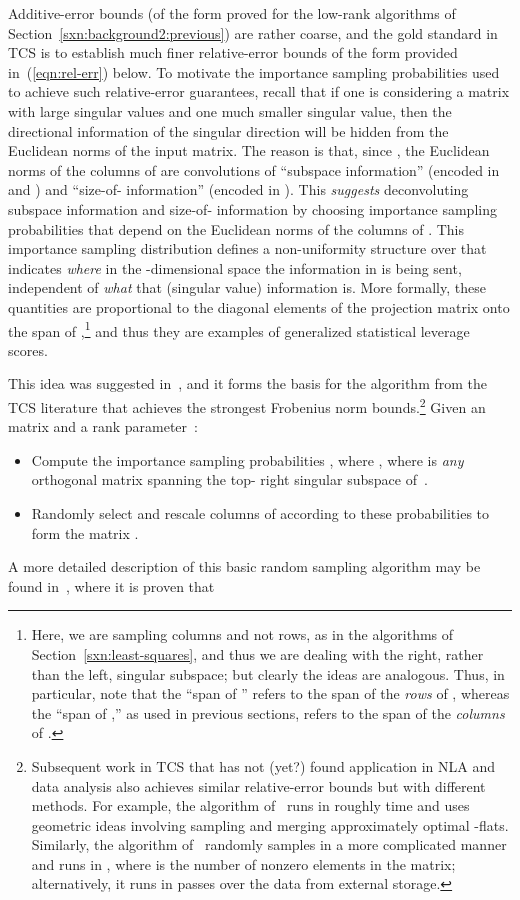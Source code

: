\documentclass[twoside]{article}
\begin{document}
Additive-error bounds (of the form proved for the low-rank algorithms of 
Section~\ref{sxn:background2:previous}) are rather coarse, and the gold 
standard in TCS is to establish much finer relative-error bounds of the 
form provided in~(\ref{eqn:rel-err}) below.
To motivate the importance sampling probabilities used to achieve such 
relative-error guarantees, recall that if one is considering a matrix with 
 large singular values and one much smaller singular value, then the 
directional information of the  singular direction will be hidden 
from the Euclidean norms of the input matrix.
The reason is that, since , the 
Euclidean norms of the columns of  are convolutions of ``subspace 
information'' (encoded in  and ) and ``size-of- information'' 
(encoded in ).
This \emph{suggests} deconvoluting subspace information and size-of- 
information by choosing importance sampling probabilities that depend on the
Euclidean norms of the columns of .
This importance sampling distribution defines a non-uniformity 
structure over  that indicates \emph{where} in the 
-dimensional space the information in  is being sent, independent of 
\emph{what} that (singular value) information is.
More formally, these quantities are proportional to the diagonal elements 
of the projection matrix onto the span of ,\footnote{Here, we are sampling columns and not rows, as in the algorithms 
of Section~\ref{sxn:least-squares}, and thus we are dealing with the right,
rather than the left, singular subspace; but clearly the ideas 
are analogous.  Thus, in particular, note that the ``span of '' 
refers to the span of the \emph{rows} of , whereas the ``span of 
,'' as used in previous sections, refers to the span of the 
\emph{columns} of .}
and thus they are examples of generalized statistical leverage scores. 

This idea was suggested in~\cite{DMM08_CURtheory_JRNL,CUR_PNAS}, and it 
forms the basis for the algorithm from the TCS literature that achieves the 
strongest Frobenius norm bounds.\footnote{Subsequent work in TCS that has not (yet?) found application in 
NLA and data analysis also achieves similar relative-error bounds but with different
methods.  For example, the algorithm of~\cite{HarPeled06_relerr_DRAFT} runs 
in roughly  time and uses geometric ideas involving 
sampling and merging approximately optimal -flats.  Similarly, the 
algorithm of~\cite{DV06_relerr_TR} randomly samples in a more complicated 
manner and runs in , where  is the number of nonzero 
elements in the matrix; alternatively, it runs in  passes over the data from external 
storage.}
Given an  matrix  and a rank parameter~:
\begin{itemize}
\item
Compute the importance sampling probabilities , where 
, where  is \emph{any} 
 orthogonal matrix spanning the top- right singular subspace 
of~.
\item
Randomly select and rescale  columns of 
according to these probabilities to form the matrix .
\end{itemize}
A more detailed description of this basic random sampling algorithm may be 
found in~\cite{DMM08_CURtheory_JRNL,CUR_PNAS}, where it is proven that
\end{document}
